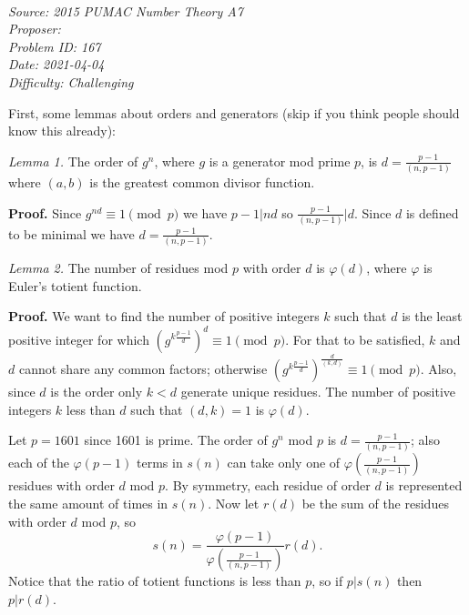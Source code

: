 \SSbreak\\
\emph{Source: 2015 PUMAC Number Theory A7}\\
\emph{Proposer: \Paiya}\\ %
\emph{Problem ID: 167}\\
\emph{Date: 2021-04-04}\\
\emph{Difficulty: Challenging}\\
\SSbreak

\bigskip

\begin{solution}\hfil\medskip
	
	First, some lemmas about orders and generators (skip if you think people should know this already): \medskip
	
	\textit{Lemma 1.} The order of $g^n$, where $g$ is a generator mod prime $p$, is $d = \frac{p - 1}{(n, p - 1)}$ where $(a, b)$ is the greatest common divisor function. 
	
	\textbf{Proof.} Since $g^{nd} \equiv 1 \pmod{p}$ we have $p - 1 | nd$ so $\frac{p - 1}{(n, p - 1)} | d$. Since $d$ is defined to be minimal we have $d = \frac{p - 1}{(n, p - 1)}$. \medskip
	
	\textit{Lemma 2.} The number of residues mod $p$ with order $d$ is $\varphi(d)$, where $\varphi$ is Euler's totient function. 
	
	\textbf{Proof.} We want to find the number of positive integers $k$ such that $d$ is the least positive integer for which $\left(g^{k\frac{p - 1}{d}}\right)^d \equiv 1 \pmod{p}$. For that to be satisfied, $k$ and $d$ cannot share any common factors; otherwise $\left(g^{k\frac{p - 1}{d}}\right)^{\frac{d}{(k, d)}} \equiv 1 \pmod{p}$. Also, since $d$ is the order only $k < d$ generate unique residues. The number of positive integers $k$ less than $d$ such that $(d, k) = 1$ is $\varphi(d)$.\medskip
	
	Let $p = 1601$ since 1601 is prime. The order of $g^n$ mod $p$ is $d = \frac{p - 1}{(n, p - 1)}$; also each of the $\varphi(p - 1)$ terms in $s(n)$ can take only one of $\varphi\left(\frac{p - 1}{(n, p - 1)}\right)$ residues with order $d$ mod $p$. By symmetry, each residue of order $d$ is represented the same amount of times in $s(n)$. Now let $r(d)$ be the sum of the residues with order $d$ mod $p$, so $$s(n) = \dfrac{\varphi(p - 1)}{\varphi\left(\frac{p - 1}{(n, p - 1)}\right)} r(d).$$ Notice that the ratio of totient functions is less than $p$, so if $p | s(n)$ then $p | r(d)$. 
	

\end{solution}

